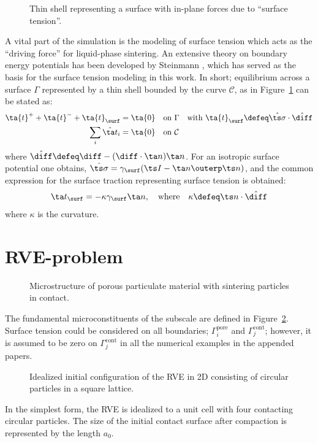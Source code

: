 \documentclass[ExampleMasters.tex]{subfiles}
\begin{document}
\begin{figure}[th!]
    \centering
    
    \caption{Thin shell representing a surface with in-plane forces due to ``surface tension''.}
    \label{fig:surfacestress}
\end{figure}
A vital part of the simulation is the modeling of surface tension which acts as the ``driving force'' for liquid-phase sintering.
An extensive theory on boundary energy potentials has been developed by Steinmann \cite{Steinmann2008:boundaryenergies}, which has served as the basis for the surface tension modeling in this work.
In short; equilibrium across a surface $\Gamma$ represented by a thin shell bounded by the curve $\mathcal{C}$, as in Figure~\ref{fig:surfacestress} can be stated as:
\begin{align}
    \ta{t}^+ + \ta{t}^- + \ta{t}_\surf &= \ta{0} \quad \mbox{on} \,\, \Gamma \quad \mbox{with } \ta{t}_\surf \defeq \hat{\ts\sigma}\cdot\hat{\diff}
\label{eq103KR}\\
    \sum_i \hat{\ta t}_i &= \ta{0} \quad \mbox{on} \,\, \mathcal{C}
\label{eq104KR}
\end{align}
where $\hat\diff \defeq \diff - (\diff\cdot\ta n)\ta n$.
For an isotropic surface potential one obtains, $\hat{\ts\sigma} = \gamma_\surf(\ts I-\ta n\outerp\ts n)$, and the common expression for the surface traction representing surface tension is obtained:
\begin{align}
 \ta t_\surf = -\kappa \gamma_\surf \ta n,\quad \text{where}\quad \kappa \defeq \ts n\cdot\hat\diff
\end{align}
where $\kappa$ is the curvature.


\section{RVE-problem}
\begin{figure}[th!]
  \centering
  
  \caption{Microstructure of porous particulate material with sintering particles in contact.}
  \label{fig:micro}
\end{figure}
The fundamental microconstituents of the subscale are defined in Figure~\ref{fig:micro}.
Surface tension could be considered on all boundaries; $\Gamma_i^{\mathrm{pore}}$ and $\Gamma_j^{\mathrm{cont}}$; however, it is assumed to be zero on $\Gamma_j^{\mathrm{cont}}$ in all the numerical examples in the appended papers.
%
\begin{figure}[H]
    \centering
    
    \caption{Idealized initial configuration of the RVE in 2D consisting of circular particles in a square lattice.}
    \label{fig:4particleRVE}
\end{figure}
%
In the simplest form, the RVE is idealized to a unit cell with four contacting circular particles.
The size of the initial contact surface after compaction is represented by the length $a_0$.
\end{document}
